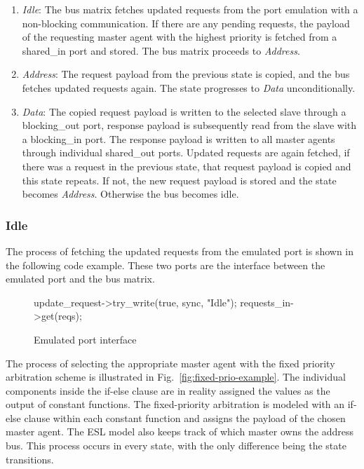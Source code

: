 \begin{enumerate}
 \item \textit{Idle}: The bus matrix fetches updated requests from the port emulation with a non-blocking communication. If there are any pending requests, the payload of the requesting master agent with the highest priority is fetched from a shared\_in port and stored. The bus matrix proceeds to \textit{Address}. 
 \item \textit{Address}: The request payload from the previous state is copied, and the bus fetches updated requests again. The state progresses to \textit{Data} unconditionally.
 \item \textit{Data}: The copied request payload is written to the selected slave through a blocking\_out port, response payload is subsequently read from the slave with a blocking\_in port. The response payload is written to all master agents through individual shared\_out ports. Updated requests are again fetched, if there was a request in the previous state, that request payload is copied and this state repeats. If not, the new request payload is stored and the state becomes \textit{Address}. Otherwise the bus becomes idle.    
\end{enumerate}

\subsubsection{Idle}
The process of fetching the updated requests from the emulated port is shown in the following code example. These two ports are the interface between the emulated port and the bus matrix.
\begin{figure}[h!]
\begin{C++}
update_request->try_write(true, sync, "Idle");
requests_in->get(reqs);
\end{C++}
\caption{Emulated port interface}
\end{figure}

The process of selecting the appropriate master agent with the fixed priority arbitration scheme is illustrated in Fig.~\ref{fig:fixed-prio-example}. The individual components inside the if-else clause are in reality assigned the values as the output of constant functions. The fixed-priority arbitration is modeled with an if-else clause within each constant function and assigns the payload of the chosen master agent. The ESL model also keeps track of which master owns the address bus. This process occurs in every state, with the only difference being the state transitions. 
\newpage

